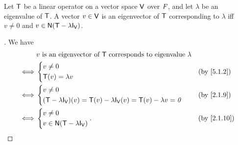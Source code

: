 \begin{thm}\label{5.4}
  Let \(\mathsf{T}\) be a linear operator on a vector space \(\mathsf{V}\) over \(\mathit{F}\), and let \(\lambda\) be an eigenvalue of \(\mathsf{T}\).
  A vector \(v \in \mathsf{V}\) is an eigenvector of \(\mathsf{T}\) corresponding to \(\lambda\) iff \(v \neq 0\) and \(v \in \ns{\T - \lambda \IT[\V]}\).
\end{thm}

\begin{proof}[]
  We have
  \begin{align*}
         & v \text{ is an eigenvector of } \T \text{ corresponds to eigenvalue } \lambda               \\
    \iff & \begin{dcases}
             v \neq 0 \\
             \T(v) = \lambda v
           \end{dcases}                                                                &  & \by{5.1.2} \\
    \iff & \begin{dcases}
             v \neq 0 \\
             (\T - \lambda \IT[\V])(v) = \T(v) - \lambda \IT[\V](v) = \T(v) - \lambda v = \zv
           \end{dcases} &  & \by{2.1.9}             \\
    \iff & \begin{dcases}
             v \neq 0 \\
             v \in \ns{\T - \lambda \IT[\V]}
           \end{dcases}.                                   &  & \by{2.1.10}
  \end{align*}
\end{proof}

